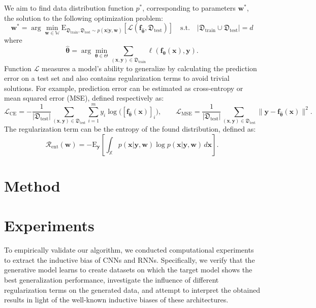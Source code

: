 \documentclass{article}
\begin{document}
We aim to find data distribution function \(p^*\), corresponding to parameters \(\mathbf{w}^*\), the solution to the following optimization problem:
\[
\mathbf{w}^* = \arg\min_{\mathbf{w} \in \mathbb{W}} \mathrm{E}_{\mathfrak{D}_{\text{train}}, \mathfrak{D}_{\text{test}} \sim p(\mathbf{x} | \mathbf{y}, \mathbf{w})} \left[ \mathcal{L}\left( \mathbf{f}_{\boldsymbol{\hat{\theta}}}, \mathfrak{D}_{\text{test}} \right) \right] \quad \text{s.t.} \quad |\mathfrak{D}_{\text{train}} \cup \mathfrak{D}_{\text{test}}| = d
\]
where 
\[\boldsymbol{\hat{\theta}} = \arg\min_{\boldsymbol{\theta} \in \Theta}\sum_{(\mathbf{x}, \mathbf{y}) \in \mathfrak{D}_{\text{train}}} \ell(\mathbf{f}_{\boldsymbol{\theta}}(\mathbf{x}), \mathbf{y}).\]
Function \(\mathcal{L}\) measures a model's ability to generalize by calculating the prediction error on a test set and also contains regularization terms to avoid trivial solutions. For example, prediction error can be estimated as cross-entropy or mean squared error (MSE), defined respectively as:
\[
\mathcal{L}_{\text{CE}} = -\frac{1}{|\mathfrak{D}_{\text{test}}|} \sum_{(\mathbf{x}, \mathbf{y}) \in \mathfrak{D}_{\text{test}}} \sum_{i=1}^{m} y_i \log\big( [\mathbf{f}_{\boldsymbol{\hat{\theta}}}(\mathbf{x})]_i \big), \qquad
\mathcal{L}_{\text{MSE}} = \frac{1}{|\mathfrak{D}_{\text{test}}|} \sum_{(\mathbf{x}, \mathbf{y}) \in\mathfrak{D}_{\text{test}}} \| \mathbf{y} - \mathbf{f}_{\boldsymbol{\hat{\theta}}}(\mathbf{x}) \|^2.
\]
The regularization term can be the entropy of the found distribution, defined as:
\[
\mathcal{R}_{\text{ent}}(\mathbf{w}) = - \mathrm{E}_{\mathbf{y}} \left[ \int_{\mathbb{X}} p(\mathbf{x} | \mathbf{y}, \mathbf{w}) \log p(\mathbf{x} | \mathbf{y}, \mathbf{w}) \, d\mathbf{x} \right].
\]

\section{Method}\label{sec:method}

\section{Experiments}\label{sec:exp}

To empirically validate our algorithm, we conducted computational experiments to extract the inductive bias of CNNs and RNNs. Specifically, we verify that the generative model learns to create datasets on which the target model shows the best generalization performance, investigate the influence of different regularization terms on the generated data, and attempt to interpret the obtained results in light of the well-known inductive biases of these architectures.
\end{document}
